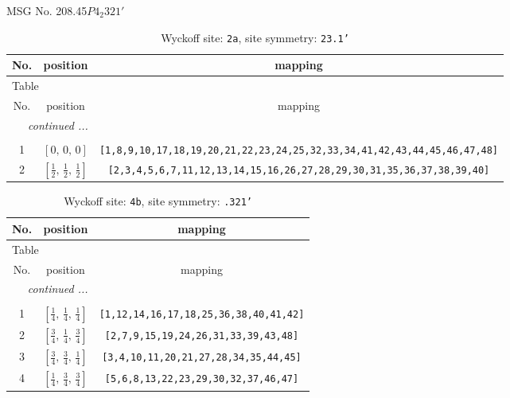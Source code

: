 \documentclass[fleqn,8pt]{jsarticle}
\begin{document}
\setcounter{MaxMatrixCols}{32}

\renewcommand{\tablename}{Table~}
\renewcommand{\figurename}{Figure~}
\begin{center}
\LARGE
MSG No. 208.45\quad$P4_{2}321'$
\end{center}
\renewcommand{\arraystretch}{1.2}
\begin{longtable}{ccc}
\caption{Wyckoff site: {\tt 2a}, site symmetry: {\tt 23.1'}}
 \\
 \hline \hline
No. & position & mapping \\ \hline \endfirsthead

\multicolumn{2}{l}{\tablename\ \thetable{}} \\
 \hline \hline
No. & position & mapping \\ \hline \endhead

 \hline \hline
\multicolumn{2}{r}{\footnotesize\it continued ...} \\ \endfoot

 \hline \hline
\multicolumn{2}{r}{} \\ \endlastfoot

1 & $\left[ 0,\, 0,\, 0 \right]$ & {\tt [1,8,9,10,17,18,19,20,21,22,23,24,25,32,33,34,41,42,43,44,45,46,47,48]} \\ \hline
2 & $\left[ \frac{1}{2},\, \frac{1}{2},\, \frac{1}{2} \right]$ & {\tt [2,3,4,5,6,7,11,12,13,14,15,16,26,27,28,29,30,31,35,36,37,38,39,40]} \\
\end{longtable}
\renewcommand{\arraystretch}{1.2}
\begin{longtable}{ccc}
\caption{Wyckoff site: {\tt 4b}, site symmetry: {\tt .321'}}
 \\
 \hline \hline
No. & position & mapping \\ \hline \endfirsthead

\multicolumn{2}{l}{\tablename\ \thetable{}} \\
 \hline \hline
No. & position & mapping \\ \hline \endhead

 \hline \hline
\multicolumn{2}{r}{\footnotesize\it continued ...} \\ \endfoot

 \hline \hline
\multicolumn{2}{r}{} \\ \endlastfoot

1 & $\left[ \frac{1}{4},\, \frac{1}{4},\, \frac{1}{4} \right]$ & {\tt [1,12,14,16,17,18,25,36,38,40,41,42]} \\ \hline
2 & $\left[ \frac{3}{4},\, \frac{1}{4},\, \frac{3}{4} \right]$ & {\tt [2,7,9,15,19,24,26,31,33,39,43,48]} \\ \hline
3 & $\left[ \frac{3}{4},\, \frac{3}{4},\, \frac{1}{4} \right]$ & {\tt [3,4,10,11,20,21,27,28,34,35,44,45]} \\ \hline
4 & $\left[ \frac{1}{4},\, \frac{3}{4},\, \frac{3}{4} \right]$ & {\tt [5,6,8,13,22,23,29,30,32,37,46,47]} \\
\end{longtable}
\end{document}
